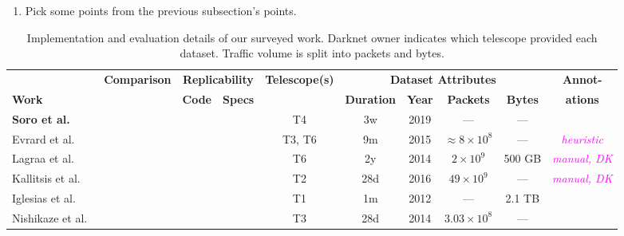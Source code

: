 \documentclass[manuscript,nonacm]{acmart}
\newcommand{\cmark}{\ding{51}}%
\newcommand{\xmark}{\ding{55}}%
\newcommand{\wc}[1]{\textit{\textcolor{magenta}{#1}}} %
\begin{document}
\begin{enumerate}
	\item Pick some points from the previous subsection's points.
\end{enumerate}

\begin{table*}[h!]
    \small
    \setlength{\tabcolsep}{4pt}
	\caption{Implementation and evaluation details of our surveyed work. Darknet owner indicates which telescope provided each dataset. Traffic volume is split into packets and bytes.}
    \label{tab:eval}
    \begin{tabular}{@{}l p{4em} c c c c c c c c@{}}
        \toprule
        & \textbf{Comparison} & \multicolumn{2}{c}{\bf Replicability} & \textbf{Telescope(s)} & \multicolumn{4}{c}{\bf Dataset Attributes} & \textbf{Annot-} \\
        \textbf{Work} &  & \textbf{Code} & \textbf{Specs} &  & \textbf{Duration} & \textbf{Year} & \textbf{Packets} & \textbf{Bytes} & \textbf{ations} \\
        \midrule
        \textbf{Soro et al.~\cite{2020soro}}
        & \xmark
        & \xmark & \xmark
        & T4
        & 3w & 2019
        & --- & ---
        & \xmark \\

        Evrard et al.~\cite{2019evrard}
        & \xmark
        & \xmark & \xmark
        & T3, T6
        & 9m & 2015
        & ${\approx}8\times10^{8}$ & ---
        & \wc{heuristic} \\

        Lagraa et al.~\cite{2017lagraa,2019lagraa}
        & \xmark
        & \xmark & \cmark
        & T6
        & 2y & 2014
        & $2\times10^{9}$ & 500 GB
        & \wc{manual, DK} \\

        Kallitsis et al.~\cite{2022kallitsis}
        & \cmark~\cite{2021gioacchini}
        & \cmark & \cmark
        & T2
        & 28d & 2016
        & $49\times10^{9}$ & ---
        & \wc{manual, DK} \\

        Iglesias et al.~\cite{2019iglesias}
        & \xmark
        & \xmark & \cmark
        & T1
        & 1m & 2012
        & --- & 2.1 TB
        & \xmark \\

        Nishikaze et al.~\cite{2015nishikaze}
        & \xmark
        & \xmark & \xmark
        & T3
        & 28d & 2014
        & $3.03\times10^{8}$ & ---
        & \xmark \\


\end{tabular}
\end{table*}
\end{document}
